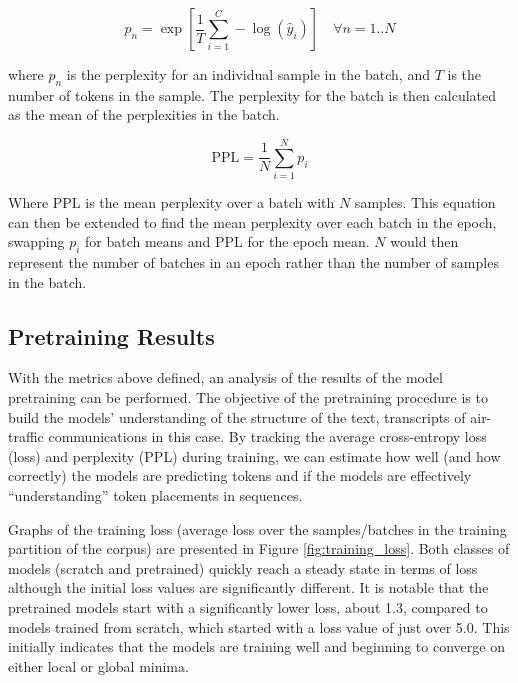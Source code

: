 \documentclass[12pt]{article}
\begin{document}
\begin{equation}\label{eq:perplexity}
    p_n = \exp \left[ \frac{1}{T}\sum_{i=1}^C - \log(\hat{y}_i) \right] \quad \forall n = 1..N
\end{equation}

\noindent
where $p_n$ is the perplexity for an individual sample in the batch, and $T$ is the number of tokens in the sample. The perplexity for the batch is
then calculated as the mean of the perplexities in the batch.

\begin{equation}\label{eq:perplexity_mean}
    \mbox{PPL} = \frac{1}{N}\sum_{i=1}^{N}p_i
\end{equation}

\noindent
Where $\mbox{PPL}$ is the mean perplexity over a batch with $N$ samples. This equation can then be extended to find the mean perplexity over each
batch in the epoch, swapping $p_i$ for batch means and $\mbox{PPL}$ for the epoch mean. $N$ would then represent the number of batches in an epoch
rather than the number of samples in the batch.

\subsection{Pretraining Results}\label{sec:pretraining_results}
With the metrics above defined, an analysis of the results of the model pretraining can be performed. The objective of the pretraining procedure is to
build the models' understanding of the structure of the text, transcripts of air-traffic communications in this case. By tracking the average
cross-entropy loss (loss) and perplexity (PPL) during training, we can estimate how well (and how correctly) the models are predicting tokens and if
the models are effectively ``understanding'' token placements in sequences.

Graphs of the training loss (average loss over the samples/batches in the training partition of the corpus) are presented in Figure
\ref{fig:training_loss}. Both classes of models (scratch and pretrained) quickly reach a steady state in terms of loss although the initial loss
values are significantly different. It is notable that the pretrained models start with a significantly lower loss, about 1.3, compared to models
trained from scratch, which started with a loss value of just over 5.0. This initially indicates that the models are training well and beginning to
converge on either local or global minima.
\end{document}

